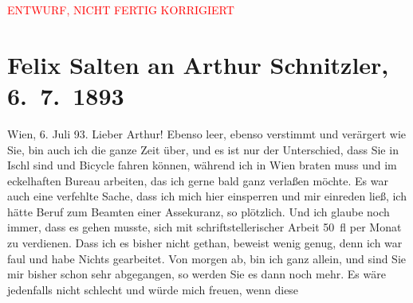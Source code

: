 
\begin{center}
            \textcolor{red}{ENTWURF, NICHT FERTIG KORRIGIERT}
                      \end{center}
            
         
         \renewcommand{\erwaehntePersonen}{Personen: Richard Beer-Hofmann, Hugo von Hofmannsthal, Paul Horn, Karl Peter Rosner, Richard Specht, Ignaz Wild}
         \renewcommand{\erwaehnteInstitutionen}{Institutionen: Saisontheater Ischl}
         \renewcommand{\erwaehnteOrte}{Orte: Bad Aussee, Bad Ischl, Rohrerhütte, Wien}
         \renewcommand{\erwaehnteWerke}{Werke: Abschiedssouper, Begräbnis, Das Märchen. Schauspiel in drei Aufzügen, Décadence. Novelletten, Psychopathia sexualis, Straßenliebe}
               \section[Felix Salten an Arthur Schnitzler, 6. 7. 1893]{ Felix Salten an Arthur Schnitzler, 6. 7. 1893}\nopagebreak{}\rehead{ }\begin{ledgroupsized}[t]{13cm}\normalsize\beginnumbering \toendnotes[C]{\smallbreak\pagebreak[2]} 
\toendnotes[C]{\smallbreak}\pstart
           {\pb}Wien, 6. Juli 93.\pend
           \pstart
           Lieber Arthur! Ebenso leer, ebenso verstimmt und verärgert wie Sie,
               bin auch ich die ganze Zeit über, und es ist nur der Unterschied, dass Sie in Ischl sind und Bicycle fahren können, während ich
               in Wien braten muss und im eckelhaften Bureau
               arbeiten, das ich gerne bald ganz verlaßen möchte. Es war auch eine verfehlte Sache,
               dass ich mich hier einsperren und mir einreden ließ, ich hätte Beruf zum Beamten
               einer Assekuranz, so plötzlich. Und ich glaube noch immer, dass es gehen musste, sich
               mit schriftstellerischer {\pb}Arbeit
               50 fl per Monat zu verdienen. Dass ich es bisher nicht gethan, beweist wenig genug,
               denn ich war faul und habe Nichts gearbeitet. Von morgen ab, bin ich ganz allein, und
               sind Sie mir bisher schon sehr abgegangen, so werden Sie es dann noch mehr. \pend
           \pstart
           Es wäre jedenfalls nicht schlecht und würde mich freuen, wenn diese \label{K_L03123-1v}
\end{ledgroupsized}
